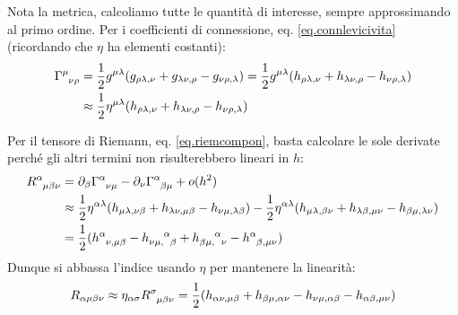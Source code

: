 Nota la metrica, calcoliamo tutte le quantità di interesse, sempre approssimando al primo ordine. Per i coefficienti di connessione, eq. \ref{eq.connlevicivita} (ricordando che $\eta$ ha elementi costanti):
\begin{align}
    \tensor{\Gamma}{^\mu_{\nu\rho}} &= \frac{1}{2}g^{\mu\lambda}( g_{\rho\lambda,\nu} + g_{\lambda\nu,\rho} - g_{\nu\rho,\lambda} ) = \frac{1}{2}g^{\mu\lambda}( h_{\rho\lambda,\nu} + h_{\lambda\nu,\rho} - h_{\nu\rho,\lambda}) \nonumber \\
    &\approx \frac{1}{2}\eta^{\mu\lambda}(h_{\rho\lambda,\nu} + h_{\lambda\nu,\rho} - h_{\nu\rho,\lambda})  \label{eq.gammalineare}
\end{align}

Per il tensore di Riemann, eq. \ref{eq.riemcompon}, basta calcolare le sole derivate perché gli altri termini non risulterebbero lineari in $h$:
\begin{align*}
    \tensor{R}{^\alpha_{\mu\beta\nu}} &= \partial_\beta \tensor{\Gamma}{^\alpha_{\nu\mu}} - \partial_\nu\tensor{\Gamma}{^\alpha_{\beta\mu}} + o(h^2) \\ &\approx \frac{1}{2}\eta^{\alpha\lambda}(h_{\mu\lambda,\nu\beta} + h_{\lambda\nu,\mu\beta} - h_{\nu\mu,\lambda\beta}) - \frac{1}{2}\eta^{\alpha\lambda}(h_{\mu\lambda,\beta\nu} + h_{\lambda\beta,\mu\nu} - h_{\beta\mu,\lambda\nu}) \\
    &= \frac{1}{2}( \tensor{h}{^\alpha_{\nu,\mu\beta}} - \tensor{h}{_{\nu\mu,}^\alpha_\beta} + \tensor{h}{_{\beta\mu,}^\alpha_\nu} - \tensor{h}{^\alpha_{\beta,\mu\nu}} )
\end{align*}
Dunque si abbassa l'indice usando $\eta$ per mantenere la linearità:
\begin{align*}
    R_{\alpha\mu\beta\nu} \approx \eta_{\alpha\sigma}\tensor{R}{^\sigma_{\mu\beta\nu}} = \frac{1}{2}(h_{\alpha\nu,\mu\beta} + h_{\beta\mu,\alpha\nu} - h_{\nu\mu,\alpha\beta} - h_{\alpha\beta,\mu\nu} )
\end{align*}

